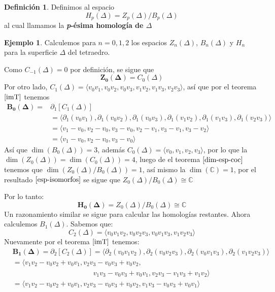 \documentclass[12pt]{book}
\theoremstyle{definition}
\newtheorem{definition}[theorem]{Definición}
\newtheorem{example}[theorem]{Ejemplo}
\newcounter{in}
\newcounter{ini}
\begin{document}
{\begin{definition}
   Definimos al espacio
   $$H_{p}(\Delta)=Z_{p}(\Delta)/B_{p}(\Delta)$$
   al cual llamamos la \textbf{\emph{p}-ésima homología de $\Delta$}
\end{definition}

\begin{example}
  Calculemos para $n=0, 1, 2$ los espacios $Z_{n}(\Delta)$,
  $B_{n}(\Delta)$ y $H_{n}$ para la superficie $\Delta$ del tetraedro.

  Como $C_{-1}(\Delta)=0$ por definición, se sigue que
  $$\boldsymbol{Z_{0}(\Delta)}=C_{0}(\Delta)$$
  Por otro lado, $C_{1}(\Delta)=\langle v_{0}v_{1},v_{0}v_{2},v_{0}v_{3},v_{1}v_{2},v_{1}v_{3},v_{2}v_{3}\rangle$,
  así que por el teorema $\ref{imT}$ tenemos 
  \begin{align*}
    \boldsymbol{B_{0}(\Delta)}=&\partial_{1}[C_{1}(\Delta)]\\
    &=\langle \partial_{1}(v_{0}v_{1}),\partial_{1}(v_{0}v_{2}),\partial_{1}(v_{0}v_{3}),\partial_{1}(v_{1}v_{2}),\partial_{1}(v_{1}v_{3}),\partial_{1}(v_{2}v_{3})\rangle\\
    &=\langle v_{1}-v_{0},v_{2}-v_{0},v_{3}-v_{0},v_{2}-v_{1},v_{3}-v_{1},v_{3}-v_{2}\rangle\\
    &=\langle v_{1}-v_{0},v_{2}-v_{0},v_{3}-v_{0}\rangle
  \end{align*}
  Así que $\dim(B_{0}(\Delta))=3$, además $C_{0}(\Delta)=\langle
  v_{0},v_{1},v_{2},v_{3}\rangle$, por lo que la
  $\dim(Z_{0}(\Delta))=\dim(C_{0}(\Delta))=4$, luego de el teorema
  $\ref{dim-esp-coc}$ tenemos que
  $\dim(Z_{0}(\Delta)/B_{0}(\Delta))=1$, así mismo la
  $\dim(\mathbb{C})=1$, por el resultado $\ref{esp-isomorfos}$ se sigue
  que $Z_{0}(\Delta)/B_{0}(\Delta)\cong \mathbb{C}$

  Por lo tanto:
  $$\boldsymbol{H_{0}(\Delta)}=Z_{0}(\Delta)/B_{0}(\Delta)\cong \mathbb{C}$$
  Un razonamiento similar se sigue para calcular las homologías restantes.
  Ahora calculemos $B_{1}(\Delta)$. Sabemos que:
  $$C_{2}(\Delta)=\langle
  v_{0}v_{1}v_{2},v_{0}v_{2}v_{3},v_{0}v_{1}v_{3},v_{1}v_{2}v_{3}\rangle$$
  Nuevamente por el teorema $\ref{imT}$ tenemos:
  \begin{align}  
    \label{generadores-B1}
    &\boldsymbol{B_{1}(\Delta)}=\partial_{2}[C_{2}(\Delta)]=\langle\partial_{2}(v_{0}v_{1}v_{2}),\partial_{2}(v_{0}v_{2}v_{3}),\partial_{2}(v_{0}v_{1}v_{3}),\partial_{2}
    (v_{1}v_{2}v_{3})\rangle \nonumber\\
    &=\langle v_{1}v_{2}-v_{0}v_{2}+v_{0}v_{1},v_{2}v_{3}-v_{0}v_{3}+v_{0}v_{2},\nonumber\\
    &\phantom{{}=v_{1}v_{2}-v_{0}v_{2}+v_{0}v_{1},v_{2}v_{3}}v_{1}v_{3}-v_{0}v_{3}+v_{0}v_{1},v_{2}v_{3}-v_{1}v_{3}+v_{1}v_{2}\rangle\nonumber\\
    &=\langle v_{1}v_{2}-v_{0}v_{2}+v_{0}v_{1},v_{2}v_{3}-v_{0}v_{3}+v_{0}v_{2},v_{1}v_{3}-v_{0}v_{3}+v_{0}v_{1}\rangle
  \end{align} 
 

\end{example}}
\end{document}
